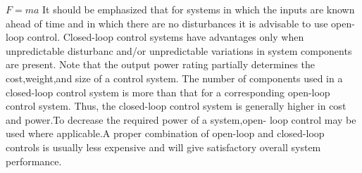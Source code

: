 \documentclass{report}
\begin{document}
$F = ma$ It should be emphasized that for systems in which the inputs are known ahead of time and in which there are no disturbances it is advisable to use open-loop control.  Closed-loop control systems have advantages only when unpredictable disturbanc  and/or unpredictable variations in system components are present. Note that the  output power rating partially determines the cost,weight,and size of a control system.  The number of components used in a closed-loop control system is more than that for  a corresponding open-loop control system. Thus, the closed-loop control system is generally higher in cost and power.To decrease the required power of a system,open-  loop control may be used where applicable.A proper combination of open-loop and  closed-loop controls is usually less expensive and will give satisfactory overall system  performance.
\end{document}
